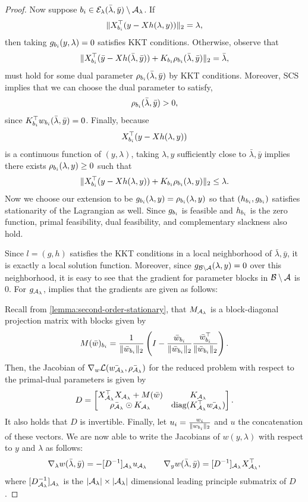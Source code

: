 \begin{proof}
	Now suppose \( {b_i} \in {\mathcal{E}_{\lambda}}(\bar \lambda, \bar y) \setminus {\mathcal{A}_{\lambda}} \).
	If
	\[
		\|X_{b_i}^\top (y - X h(\lambda, y))\|_2 = \lambda,
	\]
	then taking \( g_{b_i}(y, \lambda) = 0 \) satisfies KKT conditions.
	Otherwise, observe that
	\[
		\|X_{b_i}^\top (\bar y - X h(\bar \lambda, \bar y)) + K_{{b_i}} \rho_{{b_i}}(\bar \lambda, \bar y)\|_2
		= \bar \lambda,
	\]
	must hold for some dual parameter \( \rho_{{b_i}}(\bar \lambda, \bar y) \)
	by KKT conditions.
	Moreover, SCS implies that we can choose the dual parameter to satisfy,
	\[ \rho_{{b_i}}(\bar \lambda, \bar y) > 0, \]
	since \( K_{{b_i}}^\top w_{b_i}(\bar \lambda, \bar y) = 0 \).
	Finally, because
	\[ X_{b_i}^\top (y - X h(\lambda, y)) \]
	is a continuous function of \( (y, \lambda) \), taking
	\( \lambda, y \) sufficiently close to \( \bar \lambda, \bar y \)
	implies there exists \( \rho_{{b_i}}(\lambda, y) \geq 0 \) such that
	\[
		\|X_{b_i}^\top (y - X h(\lambda, y)) + K_{{b_i}} \rho_{{b_i}}(\lambda, y)\|_2
		\leq \lambda.
	\]
	Now we choose our extension to be
	\( g_{b_i}(\lambda, y) = \rho_{{b_i}}(\lambda, y) \)
	so that \( (h_{b_i}, g_{b_i}) \) satisfies stationarity of the Lagrangian
	as well.
	Since \( g_{b_i} \) is feasible and \( h_{b_i} \)  is the zero function,
	primal feasibility, dual feasibility, and complementary slackness also hold.

	Since \( l = (g, h) \) satisfies the KKT conditions in a local neighborhood
	of \( \bar \lambda, \bar y \), it is exactly a local solution function.
	Moreover, since \( g_{\mathcal{B} \setminus \mathcal{A}}(\lambda, y) = 0 \)
	over this neighborhood, it is easy to see that the gradient
	for parameter blocks in \( \mathcal{B} \setminus \mathcal{A} \)
	is \( 0 \).
	For \( g_{\mathcal{A}_{\lambda}} \), \citet[Theorem 5.1]{fiacco1990sensitivity} implies that the
	gradients are given as follows:

	Recall from \cref{lemma:second-order-stationary},
	that \( M_{\mathcal{A}_{\lambda}} \) is a block-diagonal projection matrix
	with blocks given by
	\[
		M(\bar w)_{b_i} = \frac{1}{\|\bar{w}_{b_i}\|_2} \left(I - \frac{\bar{w}_{b_i}}{\|\bar{w}_{b_i}\|_2}\frac{\bar{w}_{b_i}^\top}{\|\bar{w}_{b_i}\|_2}\right).
	\]
	Then, the Jacobian of \( \nabla_w \mathcal{L}(\bar {w_{\mathcal{A}_{\lambda}}}, \bar {\rho_{{\mathcal{A}_{\lambda}}}}) \)
	for the reduced problem with respect to the primal-dual parameters is
	given by
	\[
		D =
		\begin{bmatrix}
			X_{\mathcal{A}_{\lambda}}^\top X_{\mathcal{A}_{\lambda}} + M(\bar w) & K_{\mathcal{A}_{\lambda}}                            \\
			\bar {\rho_{{\mathcal{A}_{\lambda}}}} \odot K_{\mathcal{A}_{\lambda}}       & \text{diag}(K_{\mathcal{A}_{\lambda}}^\top \bar {w_{\mathcal{A}_{\lambda}}})
		\end{bmatrix}.
	\]
	It also holds that \( D \) is invertible.
	Finally, let \( u_i = \frac{w_i}{\|w_{b_i}\|_2} \)
	and \( u \) the concatenation of these vectors.
	We are now able to write the
	Jacobians of \( w(y, \lambda) \)
	with respect to \( y \) and \( \lambda \)
	as follows:
	\[
		\nabla_\lambda w(\bar \lambda, \bar y)
		= - [D^{-1}]_{\mathcal{A}_{\lambda}} u_{\mathcal{A}_{\lambda}}
		\quad \quad
		\nabla_y w(\bar \lambda, \bar y)
		= [D^{-1}]_{\mathcal{A}_{\lambda}} X_{\mathcal{A}_{\lambda}}^\top,
	\]
	where \( [D_{\mathcal{A}_{\lambda}}^{-1}]_{\mathcal{A}_{\lambda}} \) is the \( |{\mathcal{A}_{\lambda}}| \times |{\mathcal{A}_{\lambda}}| \)
	dimensional leading principle submatrix of \( D \).
\end{proof}

